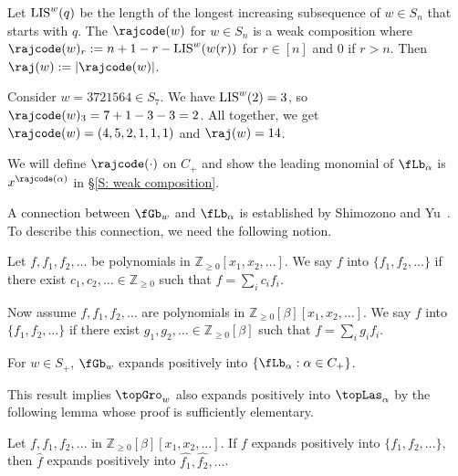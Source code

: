 \begin{defn}\cite{PSW}
\label{D: raj on permutations}
Let $\textup{LIS}^w(q)$ be the 
length of the longest increasing subsequence 
of $w\in S_n$ that starts with $q$.
The $\rajcode(w)$ for $w\in S_n$ is a weak composition
where 
$\rajcode(w)_r := n + 1 - r - \textup{LIS}^w(w(r))$ for $r \in [n]$
and $0$ if $r > n$.
Then $\raj(w) := |\rajcode(w)|$.
\end{defn}


\begin{exa}
\label{E: rajcode permutation}
Consider $w = 3721564 \in S_7$. We have $\textup{LIS}^w(2) = 3$, 
so $\rajcode(w)_3 = 7 + 1 - 3 - 3 = 2$.
All together,
we get $\rajcode(w) = (4,5,2,1,1,1)$ and $\raj(w) = 14$.
\end{exa}

We will define $\rajcode(\cdot)$ on $C_+$
and show the leading monomial of $\fLb_\alpha$ is $x^{\rajcode(\alpha)}$
in \S\ref{S: weak composition}.

A connection between $\fGb_w$ and $\fLb_\alpha$
is established by Shimozono and Yu~\cite{SY}.
To describe this connection, 
we need the following notion.
\begin{defn}
Let $f, f_1, f_2, \dots$ be polynomials in 
$\mathbb{Z}_{\geq 0}[x_1, x_2,\dots]$.
We say $f$  
into $\{f_1,f_2, \dots\}$ if there exist 
$c_1,c_2, \dots \in \mathbb{Z}_{\geq 0}$
such that $f = \sum_{i} c_if_i$.

Now assume $f, f_1, f_2, \dots$ are polynomials 
in $\mathbb{Z}_{ \geq 0}[\beta][x_1, x_2,\dots]$.
We say $f$  
into $\{f_1,f_2, \dots\}$ if there exist 
$g_1,g_2, \dots \in \mathbb{Z}_{\geq 0}[\beta]$ 
such that $f = \sum_{i} g_if_i$.
\end{defn}

\begin{ourthm}[\cite{SY}]
\label{T: Gro to Las}
For $w \in S_+$, $\fGb_w$ expands positively
into $\{\fLb_\alpha: \alpha \in C_+\}$. 
\end{ourthm}
 
This result implies
$\topGro_w$ also expands
positively into
$\topLas_\alpha$ by the following lemma whose proof
is sufficiently elementary. 

\begin{lemma}
\label{L: Expands positively}
Let $f, f_1, f_2, \dots$ 
in $\mathbb{Z}_{\geq 0}[\beta][x_1, x_2,\dots]$.
If $f$ expands positively 
into $\{f_1, f_2, \dots\}$,
then $\widehat{f}$ expands positively into $\widehat{f_1}, \widehat{f_2}, \dots $.
\end{lemma}

